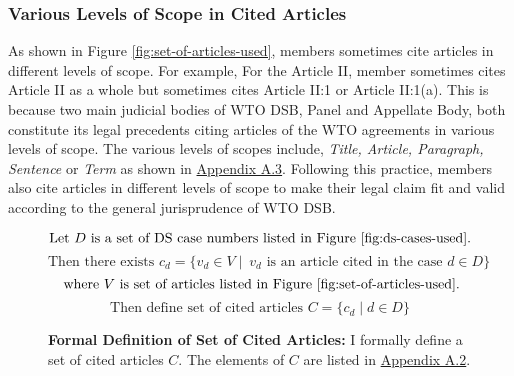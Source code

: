 \subsubsection{Various Levels of Scope in Cited Articles}

As shown in Figure \ref{fig:set-of-articles-used},
members sometimes
cite articles in different levels of scope. For example,
For the Article II, member sometimes cites
Article II as a whole but sometimes cites
Article II:1 or Article II:1(a).
This is because two main judicial bodies of WTO DSB, Panel and Appellate Body,
both constitute its legal precedents citing articles of the WTO agreements in
various levels of scope.
The various levels of scopes include, \textit{Title, Article, Paragraph, Sentence} or \textit{Term} as shown in  \hyperref[xltabular:level-of-scopes]{Appendix A.3}.
Following this practice, members also cite articles in different levels of scope to
make their legal claim fit and valid according to the general jurisprudence of WTO DSB.\\ %

\begin{figure}[t]
   \[\text{Let } D \text{ is a set of DS case numbers listed in Figure \ref{fig:ds-cases-used}.} \] %
   \[\text{Then there exists } c_d = \{v_d \in V \mid\ v_d \text{ is an article cited in the case } d \in D\} \]
   \[\text{ where } V \text{ is set of articles listed in Figure \ref{fig:set-of-articles-used}}.\]
   \[\text{Then define set of cited articles } C = \{c_d \mid d \in D\}\]
   \caption{\textbf{Formal Definition of Set of Cited Articles: }I formally define a set of cited articles $C$. The elements of $C$ are listed in \hyperref[sub:cited-articles-table]{Appendix A.2}.}
   \label{fig:def:set-of-cited-articles}
\end{figure}



